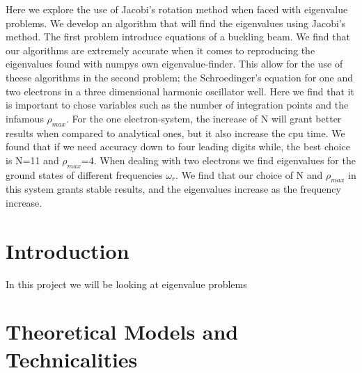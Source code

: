 \documentclass{article}
\begin{document}
Here we explore the use of Jacobi's rotation method when faced with eigenvalue problems. We develop an algorithm that will find the eigenvalues using Jacobi's method. The first problem introduce equations of a buckling beam. We find that our algorithms are extremely accurate when it comes to reproducing the eigenvalues found with numpys own eigenvalue-finder.  This allow for the use of theese algorithms in the second problem; the Schroedinger's equation for one and two electrons in a three dimensional harmonic oscillator well. Here we find that it is important to chose variables such as the number of integration points and the infamous $\rho_{max}$. For the one electron-system, the increase of N will grant better results when compared to analytical ones, but it also increase the cpu time. We found that if we need accuracy down to four leading digits while, the best choice is N=11 and $\rho_{max}$=4. When dealing with two electrons we find eigenvalues for the ground states of different frequencies $\omega_r$. We find that our choice of N and $\rho_{max}$ in this system grants stable results, and the eigenvalues increase as the frequency increase.

\section{Introduction}

In this project we will be looking at eigenvalue problems



\section{Theoretical Models and Technicalities}
\end{document}
